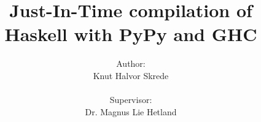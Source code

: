 \documentclass[12pt,a4paper]{book}
\begin{document}
\title{Just-In-Time compilation of\\Haskell with PyPy and GHC}
\author{Author:\\
Knut Halvor Skrede\\
\\
Supervisor:
\\
Dr. Magnus Lie Hetland}


\begin{titlepage}
\maketitle
\end{titlepage}


\clearpage

\clearpage

\setcounter{tocdepth}{2}
\tableofcontents
\clearpage

\pagestyle{plain}
\setcounter{page}{1}



%




%
%





%

\clearpage



\clearpage
\appendix
\appendixpage



\end{document}
